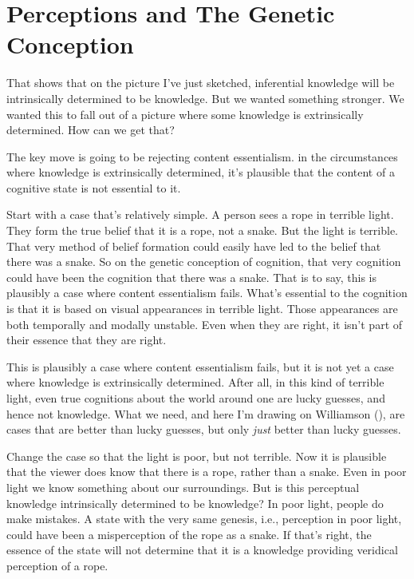 \documentclass[
  10pt,
  letterpaper,
  DIV=11,
  numbers=noendperiod,
  twoside]{scrartcl}
\begin{document}
\section{Perceptions and The Genetic Conception}\label{sec-perception}

That shows that on the picture I've just sketched, inferential knowledge
will be intrinsically determined to be knowledge. But we wanted
something stronger. We wanted this to fall out of a picture where some
knowledge is extrinsically determined. How can we get that?

The key move is going to be rejecting content essentialism. in the
circumstances where knowledge is extrinsically determined, it's
plausible that the content of a cognitive state is not essential to it.

Start with a case that's relatively simple. A person sees a rope in
terrible light. They form the true belief that it is a rope, not a
snake. But the light is terrible. That very method of belief formation
could easily have led to the belief that there was a snake. So on the
genetic conception of cognition, that very cognition could have been the
cognition that there was a snake. That is to say, this is plausibly a
case where content essentialism fails. What's essential to the cognition
is that it is based on visual appearances in terrible light. Those
appearances are both temporally and modally unstable. Even when they are
right, it isn't part of their essence that they are right.

This is plausibly a case where content essentialism fails, but it is not
yet a case where knowledge is extrinsically determined. After all, in
this kind of terrible light, even true cognitions about the world around
one are lucky guesses, and hence not knowledge. What we need, and here
I'm drawing on Williamson (), are
cases that are better than lucky guesses, but only \emph{just} better
than lucky guesses.

Change the case so that the light is poor, but not terrible. Now it is
plausible that the viewer does know that there is a rope, rather than a
snake. Even in poor light we know something about our surroundings. But
is this perceptual knowledge intrinsically determined to be knowledge?
In poor light, people do make mistakes. A state with the very same
genesis, i.e., perception in poor light, could have been a misperception
of the rope as a snake. If that's right, the essence of the state will
not determine that it is a knowledge providing veridical perception of a
rope.
\end{document}
